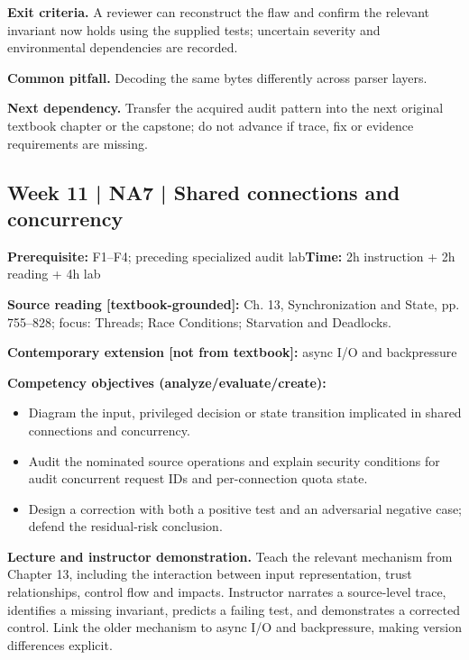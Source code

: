 \documentclass[10pt,letterpaper]{article}
\begin{document}
\textbf{Exit criteria.} A reviewer can reconstruct the flaw and confirm the relevant invariant now holds using the supplied tests; uncertain severity and environmental dependencies are recorded.

\textbf{Common pitfall.} Decoding the same bytes differently across parser layers.

\textbf{Next dependency.} Transfer the acquired audit pattern into the next original textbook chapter or the capstone; do not advance if trace, fix or evidence requirements are missing.

\subsection{Week 11 | NA7 | Shared connections and concurrency}
\textbf{Prerequisite:} F1--F4; preceding specialized audit lab\hfill\textbf{Time:} 2h instruction + 2h reading + 4h lab

\textbf{Source reading [textbook-grounded]:} Ch. 13, Synchronization and State, pp. 755--828; focus: Threads; Race Conditions; Starvation and Deadlocks.

\textbf{Contemporary extension [not from textbook]:} async I/O and backpressure

\textbf{Competency objectives (analyze/evaluate/create):}
\begin{itemize}[leftmargin=*,itemsep=2pt]
\item Diagram the input, privileged decision or state transition implicated in shared connections and concurrency.
\item Audit the nominated source operations and explain security conditions for audit concurrent request IDs and per-connection quota state.
\item Design a correction with both a positive test and an adversarial negative case; defend the residual-risk conclusion.
\end{itemize}
\textbf{Lecture and instructor demonstration.} Teach the relevant mechanism from Chapter 13, including the interaction between input representation, trust relationships, control flow and impacts. Instructor narrates a source-level trace, identifies a missing invariant, predicts a failing test, and demonstrates a corrected control. Link the older mechanism to async I/O and backpressure, making version differences explicit.
\end{document}
